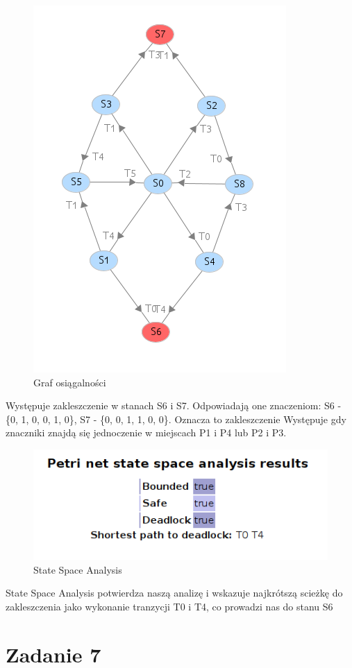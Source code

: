 \documentclass[12pt,a4paper,table]{article}
\begin{document}
    \begin{figure}[H]
        \centering
        \includegraphics[width=0.6\linewidth]{img/zad6-2.png}
        \caption{Graf osiągalności}
        \label{fig:zad6-2}
    \end{figure}

    Występuje zakleszczenie w stanach S6 i S7. Odpowiadają one znaczeniom:
        S6 - \{0, 1, 0, 0, 1, 0\}, S7 - \{0, 0, 1, 1, 0, 0\}. Oznacza to zakleszczenie Występuje
        gdy znaczniki znajdą się jednoczenie w miejscach P1 i P4 lub P2 i P3.

    \begin{figure}[H]
        \centering
        \includegraphics[width=0.6\linewidth]{img/zad6-3.png}
        \caption{State Space Analysis}
        \label{fig:zad6-3}
    \end{figure}

    State Space Analysis potwierdza naszą analizę i wskazuje najkrótszą scieżkę do
    zakleszczenia jako wykonanie tranzycji T0 i T4, co prowadzi nas do stanu S6

    \section{Zadanie 7}
\end{document}
